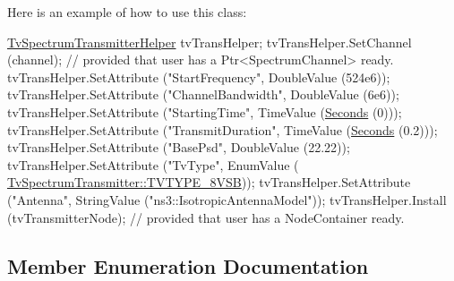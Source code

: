 Here is an example of how to use this class\+: 
\begin{DoxyCode}
\hyperlink{classns3_1_1TvSpectrumTransmitterHelper_a017080c0fc9fb9f154589e737fe18829}{TvSpectrumTransmitterHelper} tvTransHelper;
tvTransHelper.SetChannel (channel); \textcolor{comment}{// provided that user has a Ptr<SpectrumChannel> ready.}
tvTransHelper.SetAttribute (\textcolor{stringliteral}{"StartFrequency"}, DoubleValue (524e6));
tvTransHelper.SetAttribute (\textcolor{stringliteral}{"ChannelBandwidth"}, DoubleValue (6e6));
tvTransHelper.SetAttribute (\textcolor{stringliteral}{"StartingTime"}, TimeValue (\hyperlink{group__timecivil_ga33c34b816f8ff6628e33d5c8e9713b9e}{Seconds} (0)));
tvTransHelper.SetAttribute (\textcolor{stringliteral}{"TransmitDuration"}, TimeValue (\hyperlink{group__timecivil_ga33c34b816f8ff6628e33d5c8e9713b9e}{Seconds} (0.2)));
tvTransHelper.SetAttribute (\textcolor{stringliteral}{"BasePsd"}, DoubleValue (22.22));
tvTransHelper.SetAttribute (\textcolor{stringliteral}{"TvType"}, EnumValue (
      \hyperlink{classns3_1_1TvSpectrumTransmitter_a9ec4fd6860d2d287b1304397b425f0d8aeca316e65358d933299c96fbab39a325}{TvSpectrumTransmitter::TVTYPE\_8VSB}));
tvTransHelper.SetAttribute (\textcolor{stringliteral}{"Antenna"}, StringValue (\textcolor{stringliteral}{"ns3::IsotropicAntennaModel"}));
tvTransHelper.Install (tvTransmitterNode); \textcolor{comment}{// provided that user has a NodeContainer ready.}
\end{DoxyCode}
 

\subsection{Member Enumeration Documentation}
